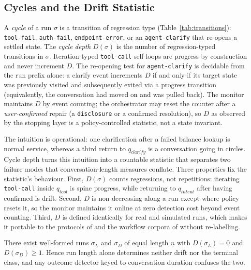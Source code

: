 \subsection{Cycles and the Drift Statistic}

\begin{definition}
\label{def:cycledepth}
A \emph{cycle} of a run $\sigma$ is a transition of regression type (Table~\ref{tab:transitions}):
\texttt{tool-fail}, \texttt{auth-fail}, \texttt{endpoint-error}, or an \texttt{agent-clarify} that re-opens a settled
state.
The \emph{cycle depth} $D(\sigma)$ is the number of regression-typed transitions in $\sigma$.
Iteration-typed \texttt{tool-call} self-loops are progress by construction and never increment
$D$.
The re-opening test for \texttt{agent-clarify} is decidable from the run prefix alone: a clarify
event increments $D$ if and only if its target state was previously visited and subsequently
exited via a progress transition (equivalently, the conversation had moved on and was pulled
back).
The monitor maintains $D$ by event counting; the orchestrator may reset the counter after a
\emph{user-confirmed} repair (a \texttt{disclosure} or a confirmed resolution), so $D$ as
observed by the stopping layer is a policy-controlled statistic, not a state invariant.
\end{definition}

The intuition is operational: one clarification after a failed balance lookup is normal service,
whereas a third return to $q_{clarify}$ is a conversation going in circles.
Cycle depth turns this intuition into a countable statistic that separates two failure modes that
conversation-length measures conflate.
Three properties fix the statistic's behaviour.
First, $D(\sigma)$ counts regressions, not repetitions: iterating \texttt{tool-call} inside
$q_{tool}$ is spine progress, while returning to $q_{intent}$ after having confirmed is drift.
Second, $D$ is non-decreasing along a run except where policy resets it, so the monitor maintains
it online at zero detection cost beyond event counting.
Third, $D$ is defined identically for real and simulated runs, which makes it portable to the
protocols of \citet{sierra2024taubench} and the workflow corpora of
\citet{salesforce2025workflows} without re-labelling.

\begin{proposition}
\label{prop:longer_offpath}
There exist well-formed runs $\sigma_L$ and $\sigma_D$ of equal length $n$ with
$D(\sigma_L) = 0$ and $D(\sigma_D) \geq 1$.
Hence run length alone determines neither drift nor the terminal class, and any outcome detector
keyed to conversation duration confuses the two.
\end{proposition}

